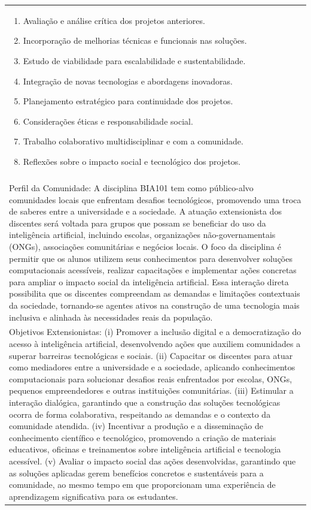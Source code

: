 \documentclass[11pt]{article}
\begin{document}
\begin{center}
\begin{longtable}{|p{4cm}|p{4cm}|p{4cm}|p{4cm}|}
{\begin{enumerate}
\item Avaliação e análise crítica dos projetos anteriores.
\item Incorporação de melhorias técnicas e funcionais nas soluções.
\item Estudo de viabilidade para escalabilidade e sustentabilidade.
\item Integração de novas tecnologias e abordagens inovadoras.
\item Planejamento estratégico para continuidade dos projetos.
\item Considerações éticas e responsabilidade social.
\item Trabalho colaborativo multidisciplinar e com a comunidade.
\item Reflexões sobre o impacto social e tecnológico dos projetos.\end{enumerate}}\\
\multicolumn{4}{|p{\dimexpr 16cm + 6\tabcolsep\relax}|}{}\\
\multicolumn{4}{|p{\dimexpr 16cm + 6\tabcolsep\relax}|}{Perfil da Comunidade: A disciplina BIA101 tem como público-alvo comunidades locais que enfrentam desafios tecnológicos, promovendo uma troca de saberes entre a universidade e a sociedade. A atuação extensionista dos discentes será voltada para grupos que possam se beneficiar do uso da inteligência artificial, incluindo escolas, organizações não-governamentais (ONGs), associações comunitárias e negócios locais. O foco da disciplina é permitir que os alunos utilizem seus conhecimentos para desenvolver soluções computacionais acessíveis, realizar capacitações e implementar ações concretas para ampliar o impacto social da inteligência artificial. Essa interação direta possibilita que os discentes compreendam as demandas e limitações contextuais da sociedade, tornando-se agentes ativos na construção de uma tecnologia mais inclusiva e alinhada às necessidades reais da população.}\\
\multicolumn{4}{|p{\dimexpr 16cm + 6\tabcolsep\relax}|}{Objetivos Extensionistas: (i) Promover a inclusão digital e a democratização do acesso à inteligência artificial, desenvolvendo ações que auxiliem comunidades a superar barreiras tecnológicas e sociais. (ii) Capacitar os discentes para atuar como mediadores entre a universidade e a sociedade, aplicando conhecimentos computacionais para solucionar desafios reais enfrentados por escolas, ONGs, pequenos empreendedores e outras instituições comunitárias. (iii) Estimular a interação dialógica, garantindo que a construção das soluções tecnológicas ocorra de forma colaborativa, respeitando as demandas e o contexto da comunidade atendida. (iv) Incentivar a produção e a disseminação de conhecimento científico e tecnológico, promovendo a criação de materiais educativos, oficinas e treinamentos sobre inteligência artificial e tecnologia acessível. (v) Avaliar o impacto social das ações desenvolvidas, garantindo que as soluções aplicadas gerem benefícios concretos e sustentáveis para a comunidade, ao mesmo tempo em que proporcionam uma experiência de aprendizagem significativa para os estudantes.}\\

\end{longtable}
\end{center}
\end{document}
